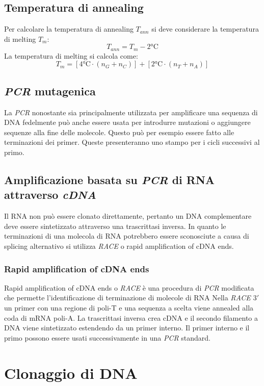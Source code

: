 	\subsection{Temperatura di annealing}
	Per calcolare la temperatura di annealing $T_{ann}$ si deve considerare la temperatura di melting $T_m$:
	\[T_{ann} = T_{m} - 2\si{\celsius}\]
	La temperatura di melting si calcola come:
	\[T_m = [4\si{\celsius} \cdot (n_G + n_C)] + [2\si{\celsius} \cdot (n_T + n_A)]\]

	\subsection{\emph{PCR} mutagenica}
	La \emph{PCR} nonostante sia principalmente utilizzata per amplificare una sequenza di DNA fedelmente pu\`o anche essere usata per introdurre mutazioni o aggiungere sequenze alla fine delle molecole.
	Questo pu\`o per esempio essere fatto alle terminazioni dei primer.
	Queste presenteranno uno stampo per i cicli successivi al primo.

	\subsection{Amplificazione basata su \emph{PCR} di RNA attraverso \emph{cDNA}}
	Il RNA non pu\`o essere clonato direttamente, pertanto un DNA complementare deve essere sintetizzato attraverso una trascrittasi inversa.
	In quanto le terminazioni di una molecola di RNA potrebbero essere sconosciute a causa di splicing alternativo si utilizza \emph{RACE} o rapid amplification of cDNA ends.

		\subsubsection{Rapid amplification of cDNA ends}
		Rapid amplification of cDNA ends o \emph{RACE} \`e una procedura di \emph{PCR} modificata che permette l'identificazione di terminazione di molecole di RNA
		Nella \emph{RACE $3'$} un primer con una regione di poli-T e una sequenza a scelta viene annealed alla coda di mRNA poli-A.
		La trascrittasi inversa crea cDNA e il secondo filamento a DNA viene sintetizzato estendendo da un primer interno.
		Il primer interno e il primo possono essere usati successivamente in una \emph{PCR} standard.

\section{Clonaggio di DNA}
	
